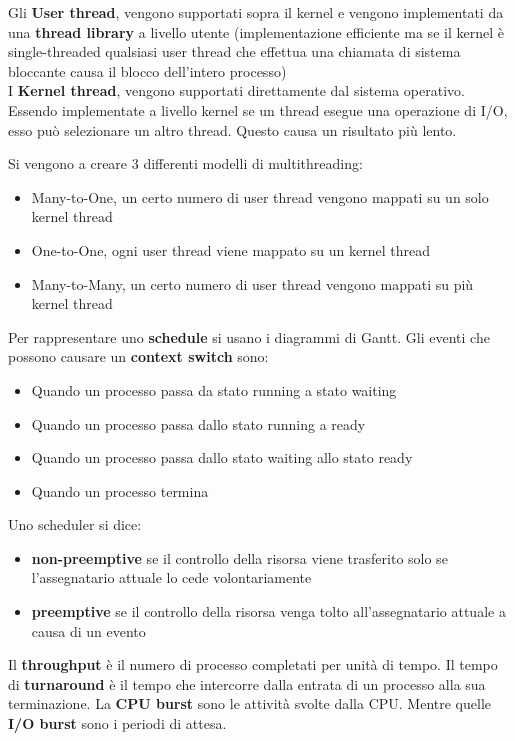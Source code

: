 \documentclass{article}
\begin{document}
Gli \textbf{User thread}, vengono supportati sopra il kernel e vengono implementati da una \textbf{thread library} a livello utente (implementazione efficiente ma se il kernel è single-threaded qualsiasi user thread che effettua una chiamata di sistema bloccante causa il blocco dell'intero processo)\\
I \textbf{Kernel thread}, vengono supportati direttamente dal sistema operativo. Essendo implementate a livello kernel se un thread esegue una operazione di I/O, esso può selezionare un altro thread. Questo causa un risultato più lento.

Si vengono a creare $3$ differenti modelli di multithreading:
\begin{itemize}
  \item Many-to-One, un certo numero di user thread vengono mappati su un solo kernel thread
  \item One-to-One, ogni user thread viene mappato su un kernel thread
  \item Many-to-Many, un certo numero di user thread vengono mappati su più kernel thread
\end{itemize}

Per rappresentare uno \textbf{schedule} si usano i diagrammi di Gantt. Gli eventi che possono causare un \textbf{context switch} sono:
\begin{itemize}
  \item Quando un processo passa da stato running a stato waiting
  \item Quando un processo passa dallo stato running a ready
  \item Quando un processo passa dallo stato waiting allo stato ready
  \item Quando un processo termina
\end{itemize}
Uno scheduler si dice:
\begin{itemize}
  \item \textbf{non-preemptive} se il controllo della risorsa viene trasferito solo se l'assegnatario attuale lo cede volontariamente
  \item \textbf{preemptive} se il controllo della risorsa venga tolto all'assegnatario attuale a causa di un evento
\end{itemize}
Il \textbf{throughput} è il numero di processo completati per unità di tempo. Il tempo di \textbf{turnaround} è il tempo che intercorre dalla entrata di un processo alla sua terminazione.
La \textbf{CPU burst} sono le attività svolte dalla CPU. Mentre quelle \textbf{I/O burst} sono i periodi di attesa.
\end{document}
